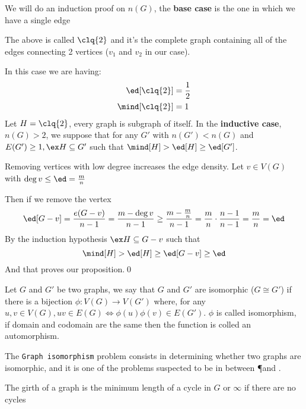 \begin{prf}
    We will do an induction proof on $n(G)$, the \textbf{base case} is the one in which we have a single edge
    \begin{figure}[h]
        \centering
        
    \end{figure}
    The above is called $\clq{2}$ and it's the complete graph containing all of the edges connecting 2 vertices ($v_1$ and $v_2$ in our case).

    In this case we are having:
    \begin{align*}
        \ed[\clq{2}] &= \frac{1}{2} \\
        \mind[\clq{2}] &= 1
    \end{align*}
    Let $H = \clq{2}$, every graph is subgraph of itself.
    In the \textbf{inductive case}, $n(G) > 2$, we suppose that for any $G'$ with $n(G') < n(G)$ and $E(G') \geq 1, \ex H \subseteq G'$ such that $\mind[H] > \ed[H] \geq \ed[G']$.
    
    Removing vertices with low degree increases the edge density. Let $v \in V(G)$ with $\deg{v} \leq \ed = \frac{m}{n}$

    Then if we remove the vertex
    \begin{equation*}
        \ed[G - v] = \frac{e(G - v)}{n - 1} = \frac{m - \deg{v}}{n - 1} \geq \frac{m - \frac{m}{n}}{n - 1} = \frac{m}{n} \cdot \frac{n - 1}{n - 1} = \frac{m}{n} = \ed
    \end{equation*}
    By the induction hypothesis $\ex H \subseteq G - v$ such that
    \begin{equation*}
        \mind[H] > \ed[H] \geq \ed[G - v] \geq \ed
    \end{equation*}
    And that proves our proposition.\qed
\end{prf}
Let $G$ and $G'$ be two graphs, we say that $G$ and $G'$ are isomorphic ($G \cong G'$) if there is a bijection $\phi: V(G) \rightarrow V(G')$ where, for any $u, v \in V(G), uv \in E(G) \iff \phi(u)\phi(v) \in E(G')$. $\phi$ is called isomorphism, if domain and codomain are the same then the function is colled an automorphism.
\begin{cf}
    The \texttt{Graph isomorphism} problem consists in determining whether two graphs are isomorphic, and it is one of the problems suspected to be in between \P and \NP.
\end{cf}
\begin{definition}[Girth]
    The girth of a graph is the minimum length of a cycle in $G$ or $\infty$ if there are no cycles
\end{definition}